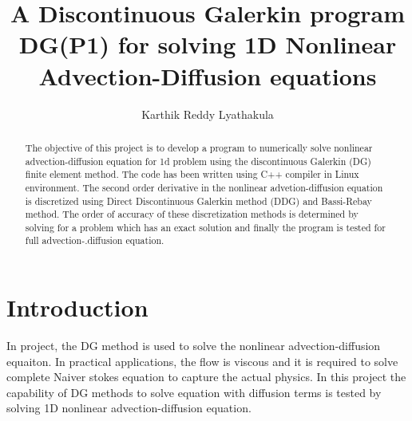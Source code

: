 \documentclass[12pt]{elsarticle}
\begin{document}
\begin{frontmatter}



\title{A Discontinuous Galerkin program DG(P1) for solving 1D Nonlinear
Advection-Diffusion equations}




\author{Karthik Reddy Lyathakula}

\address{North Carolina State University, Raleigh,  United States}

\begin{abstract}
The objective of this project is to develop a program to numerically solve nonlinear advection-diffusion equation for 1d problem using the discontinuous Galerkin (DG) finite element method. The code has been written using C++ compiler in Linux environment. The second order derivative in the nonlinear advetion-diffusion equation is discretized using Direct Discontinuous Galerkin method (DDG) and Bassi-Rebay method.  The order of accuracy of these discretization methods is determined by solving for a problem which has an exact solution and finally the program is tested for full advection-.diffusion equation.
 \end{abstract}


\end{frontmatter}


\section{Introduction}
In project, the DG method is used to solve the nonlinear advection-diffusion equaiton. In practical applications, the flow is viscous and it is required to solve complete Naiver stokes equation to capture the actual physics. In this project the capability of DG methods to solve equation with diffusion terms is tested by solving 1D nonlinear advection-diffusion equation.
\newline
\end{document}
